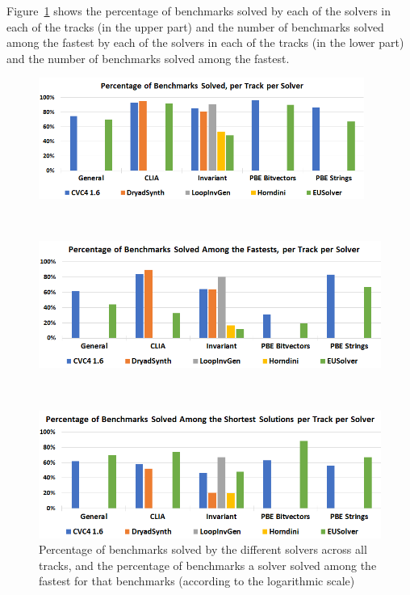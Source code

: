 Figure~\ref{fig:resultsPerTrack} shows the percentage of benchmarks solved by each of the solvers in each of the tracks (in the upper part) and the number of benchmarks solved among the fastest by each of the solvers in each of the tracks (in the lower part) and the number of benchmarks solved among the fastest. 

\begin{figure}
	\begin{center}
		\begin{minipage}{\textwidth}
			\centering
			\includegraphics[width=0.95\textwidth]{figures/Solved.png}
		\end{minipage}
		\\[1cm]
		\begin{minipage}{\textwidth}
			\centering
			\includegraphics[width=\textwidth]{figures/Fastest.png}
		\end{minipage}
		\\[1cm]
		\begin{minipage}{\textwidth}
			\centering
			\includegraphics[width=\textwidth]{figures/Smallest.png}
		\end{minipage}
	\end{center}
	\caption{Percentage of benchmarks solved by the different solvers across all tracks, and the percentage of benchmarks a solver solved among the fastest for that benchmarks (according to the logarithmic scale)}\label{fig:resultsPerTrack}	
\end{figure}


